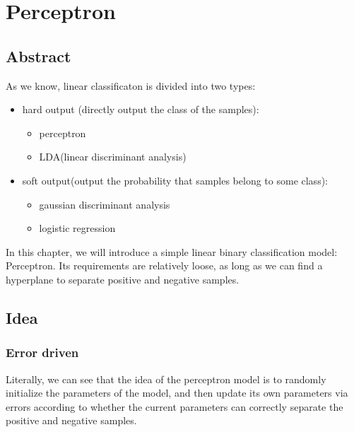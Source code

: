 \documentclass{report}
\begin{document}
\chapter{Perceptron}
\section{Abstract}
As we know, linear classificaton is divided into two types:
\begin{itemize}
	\item hard output (directly output the class of the samples):
	\begin{itemize}
		\item perceptron
		\item LDA(linear discriminant analysis)
	\end{itemize}
	\item soft output(output the probability that samples belong to some class):
	\begin{itemize}
	\item gaussian discriminant analysis
	\item logistic regression
	\end{itemize}
\end{itemize}
In this chapter, we will introduce a simple linear binary classification model: Perceptron. Its requirements are relatively loose, as long as we can find a hyperplane to separate positive and negative samples.
\section{Idea}
\subsection{Error driven}
Literally, we can see that the idea of the perceptron model is to randomly initialize the parameters of the model, and then update its own parameters via errors according to whether the current parameters can correctly separate the positive and negative samples.
\end{document}
